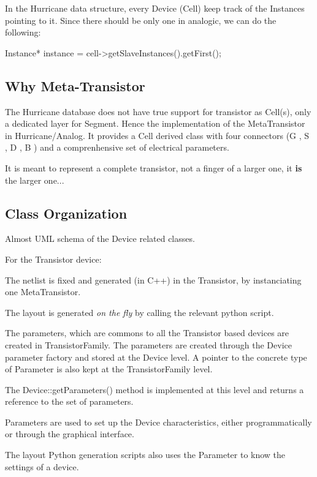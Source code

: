 In the Hurricane data structure, every Device (Cell) keep track of the Instances pointing to it. Since there should be only one in analogic, we can do the following\+:


\begin{DoxyCode}
Instance* instance = cell->getSlaveInstances().getFirst();
\end{DoxyCode}
\hypertarget{index_ssecWhyMetaTrans}{}\subsection{Why Meta-\/\+Transistor}\label{index_ssecWhyMetaTrans}
The Hurricane database does not have true support for transistor as Cell(s), only a dedicated layer for Segment. Hence the implementation of the Meta\+Transistor in Hurricane/\+Analog. It provides a Cell derived class with four connectors ({\ttfamily G} , {\ttfamily S} , {\ttfamily D} , {\ttfamily B} ) and a comprenhensive set of electrical parameters.

It is meant to represent a complete transistor, not a finger of a larger one, it {\bfseries is} the larger one...\hypertarget{index_ssecClassOrg}{}\subsection{Class Organization}\label{index_ssecClassOrg}
Almost U\+ML schema of the Device related classes.



For the Transistor device\+:


\begin{DoxyEnumerate}
\item The netlist is fixed and generated (in C++) in the Transistor, by instanciating one Meta\+Transistor.
\item The layout is generated {\itshape on the fly} by calling the relevant python script.
\item The parameters, which are commons to all the Transistor based devices are created in Transistor\+Family. The parameters are created through the Device parameter factory and stored at the Device level. A pointer to the concrete type of Parameter is also kept at the Transistor\+Family level.
\item The Device\+::get\+Parameters() method is implemented at this level and returns a reference to the set of parameters.
\item Parameters are used to set up the Device characteristics, either programmatically or through the graphical interface.

The layout Python generation scripts also uses the Parameter to know the settings of a device.
\end{DoxyEnumerate}

